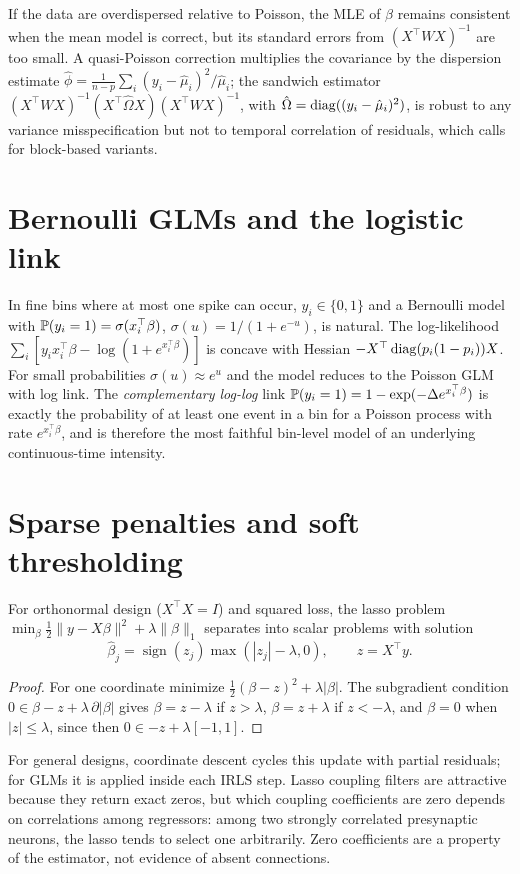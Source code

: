 If the data are overdispersed relative to Poisson, the MLE of $\beta$
remains consistent when the mean model is correct, but its standard
errors from $(X^\top WX)^{-1}$ are too small. A quasi-Poisson correction
multiplies the covariance by the dispersion estimate
$\hat\phi=\frac{1}{n-p}\sum_i(y_i-\hat\mu_i)^2/\hat\mu_i$; the
sandwich estimator $(X^\top WX)^{-1}(X^\top\hat\Omega X)(X^\top WX)^{-1}$,
with $\hat\Omega=\operatorname{diag}((y_i-\hat\mu_i)^2)$, is robust to any variance
misspecification but not to temporal correlation of residuals, which
calls for block-based variants.

\section{Bernoulli GLMs and the logistic link}
In fine bins where at most one spike can occur, $y_i\in\{0,1\}$ and a
Bernoulli model with $\mathbb{P}(y_i=1)=\sigma(x_i^\top\beta)$,
$\sigma(u)=1/(1+e^{-u})$, is natural. The log-likelihood
$\sum_i[y_ix_i^\top\beta-\log(1+e^{x_i^\top\beta})]$ is concave with
Hessian $-X^\top\operatorname{diag}(p_i(1-p_i))X$. For small probabilities
$\sigma(u)\approx e^u$ and the model reduces to the Poisson GLM with
log link. The \emph{complementary log-log} link
$\mathbb{P}(y_i=1)=1-\exp(-\Delta e^{x_i^\top\beta})$ is exactly the probability
of at least one event in a bin for a Poisson process with rate
$e^{x_i^\top\beta}$, and is therefore the most faithful bin-level model
of an underlying continuous-time intensity.

\section{Sparse penalties and soft thresholding}
For orthonormal design ($X^\top X=I$) and squared loss, the lasso
problem $\min_\beta\frac12\|y-X\beta\|^2+\lambda\|\beta\|_1$ separates
into scalar problems with solution
\[
\hat\beta_j=\operatorname{sign}(z_j)\max(|z_j|-\lambda,0),\qquad z=X^\top y.
\]
\begin{proof}
For one coordinate minimize $\frac12(\beta-z)^2+\lambda|\beta|$. The
subgradient condition $0\in\beta-z+\lambda\,\partial|\beta|$ gives
$\beta=z-\lambda$ if $z>\lambda$, $\beta=z+\lambda$ if $z<-\lambda$, and
$\beta=0$ when $|z|\le\lambda$, since then $0\in-z+\lambda[-1,1]$.
\end{proof}
For general designs, coordinate descent cycles this update with partial
residuals; for GLMs it is applied inside each IRLS step. Lasso coupling
filters are attractive because they return exact zeros, but which
coupling coefficients are zero depends on correlations among regressors:
among two strongly correlated presynaptic neurons, the lasso tends to
select one arbitrarily. Zero coefficients are a property of the
estimator, not evidence of absent connections.

